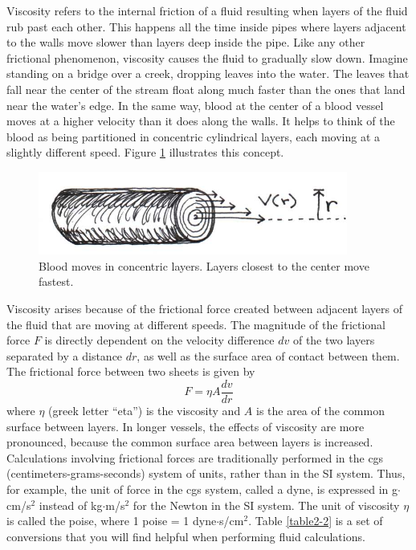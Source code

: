 Viscosity refers to the internal friction of a fluid resulting when layers of the fluid rub past each other.  This happens all the time inside pipes where layers adjacent to the walls move slower than layers deep inside the pipe.  Like any other frictional phenomenon, viscosity causes the fluid to gradually slow down.
Imagine standing on a bridge over a creek, dropping leaves into the water.  The leaves that fall near the center of the stream float along much faster than the ones that land near the water’s edge.  In the same way, blood at the center of a blood vessel moves at a higher velocity than it does along the walls.  It helps to think of the blood as being partitioned in concentric cylindrical layers, each moving at a slightly different speed.  Figure \ref{Fig2-8} illustrates this concept.  
\begin{figure}[htb]
	\centering
	\includegraphics[width=4in]{./figures/Topic2/Fig2-7.jpg}
	\caption{Blood moves in concentric layers.  Layers closest to the center move fastest.}
	\label{Fig2-8}
\end{figure}
Viscosity arises because of the frictional force created between adjacent layers of the fluid that are moving at different speeds. The magnitude of the frictional force $F$ is directly dependent on the velocity difference $dv$ of the two layers separated by a distance $dr$, as well as the surface area of contact between them. The frictional force between two sheets is given by 
\begin{equation}\label{eqn2-6}
F = \eta A \frac{dv}{dr}
\end{equation}
where $\eta$ (greek letter ``eta'') is the viscosity and $A$ is the area of the common surface between layers.  In longer vessels, the effects of viscosity are more pronounced, because the common surface area between layers is increased. Calculations involving frictional forces are traditionally performed in the cgs (centimeters-grams-seconds) system of units, rather than in the SI system.  Thus, for example, the unit of force in the cgs system, called a dyne, is expressed in g$\cdot$cm/s$^2$ instead of kg$\cdot$m/s$^2$ for the Newton in the SI system. The unit of viscosity $\eta$ is called the poise, where 1 poise = 1 dyne$\cdot$s/cm$^2$. Table \ref{table2-2} is a set of conversions that you will find helpful when performing fluid calculations.
